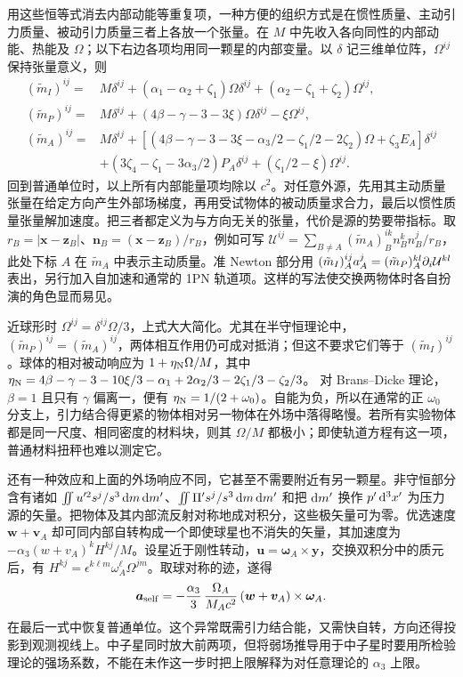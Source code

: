 用这些恒等式消去内部动能等重复项，一种方便的组织方式是在惯性质量、主动引力质量、被动引力质量三者上各放一个张量。在 $M$ 中先收入各向同性的内部动能、热能及 $\Omega$；以下右边各项均用同一颗星的内部变量。以 $\delta$ 记三维单位阵，$\Omega^{ij}$ 保持张量意义，则
\begin{align*}
 (\tilde m_I)^{ij}={}&M\delta^{ij}
 +(\alpha_1-\alpha_2+\zeta_1)\Omega\delta^{ij}
        +(\alpha_2-\zeta_1+\zeta_2)\Omega^{ij},\\
 (\tilde m_P)^{ij}={}&M\delta^{ij}
 +(4\beta-\gamma-3-3\xi)\Omega\delta^{ij}-\xi\Omega^{ij},\\
 (\tilde m_A)^{ij}={}&M\delta^{ij}
 +\left[(4\beta-\gamma-3-3\xi-\alpha_3/2-\zeta_1/2-2\zeta_2)\Omega
                     +\zeta_3E_A\right]\delta^{ij}\\
 &+(3\zeta_4-\zeta_1-3\alpha_3/2)P_A\delta^{ij}
                       +(\zeta_1/2-\xi)\Omega^{ij}.
\end{align*}
回到普通单位时，以上所有内部能量项均除以 $c^2$。对任意外源，先用其主动质量张量在给定方向产生外部场梯度，再用受试物体的被动质量求合力，最后以惯性质量张量解加速度。把三者都定义为与方向无关的张量，代价是源的势要带指标。取 $r_B=|\bm x-\bm z_B|$、$\bm n_B=(\bm x-\bm z_B)/r_B$，例如可写 $\mathcal U^{ij}=\sum_{B\ne A}(\tilde m_A)_B^{ik} n_B^k n_B^j/r_B$，此处下标 $A$ 在 $\tilde m_A$ 中表示主动质量。准 Newton 部分用 $(\tilde m_I)_A^{ij}a_A^j=(\tilde m_P)_A^{kl}\partial_i\mathcal U^{kl}$ 表出，另行加入自加速和通常的 1PN 轨道项。这样的写法使交换两物体时各自扮演的角色显而易见。

近球形时 $\Omega^{ij}=\delta^{ij}\Omega/3$，上式大大简化。尤其在半守恒理论中，$(\tilde m_P)^{ij}=(\tilde m_A)^{ij}$，两体相互作用仍可成对抵消；但这不要求它们等于 $(\tilde m_I)^{ij}$。球体的相对被动响应为 $1+\eta_{\rm N}\Omega/M$，其中
$\eta_{\rm N}=4\beta-\gamma-3-10\xi/3-\alpha_1+2\alpha_2/3-2\zeta_1/3-\zeta_2/3$。
对 Brans--Dicke 理论，$\beta=1$ 且只有 $\gamma$ 偏离一，便有 $\eta_{\rm N}=1/(2+\omega_0)$。自能为负，所以在通常的正 $\omega_0$ 分支上，引力结合得更紧的物体相对另一物体在外场中落得略慢。若所有实验物体都是同一尺度、相同密度的材料块，则其 $\Omega/M$ 都极小；即使轨道方程有这一项，普通材料扭秤也难以测定它。

还有一种效应和上面的外场响应不同，它甚至不需要附近有另一颗星。非守恒部分含有诸如 $\iint u'^2s^j/s^3\,\dd m\,\dd m'$、$\iint \Pi' s^j/s^3\,\dd m\,\dd m'$ 和把 $\dd m'$ 换作 $p'\dd[3]{x'}$ 为压力源的矢量。把物体及其内部流反射对称地成对积分，这些极矢量可为零。优选速度 $\bm w+\bm v_A$ 却可同内部自转构成一个即使球星也不消失的矢量，其加速度为 $-\alpha_3(w+v_A)^kH^{kj}/M$。设星近于刚性转动，$\bm u=\bm\omega_A\times\bm y$，交换双积分中的质元后，有 $H^{kj}=\epsilon^{k\ell m}\omega_A^\ell\Omega^{jm}$。取球对称的迹，遂得
\[
 \bm a_{\rm self}=-\frac{\alpha_3}{3}\,
    \frac{\Omega_A}{M_Ac^2}\,
             (\bm w+\bm v_A)\times\bm\omega_A .
\]
在最后一式中恢复普通单位。这个异常既需引力结合能，又需快自转，方向还得投影到观测视线上。中子星同时放大前两项，但将弱场推导用于中子星时要用所检验理论的强场系数，不能在未作这一步时把上限解释为对任意理论的 $\alpha_3$ 上限。

